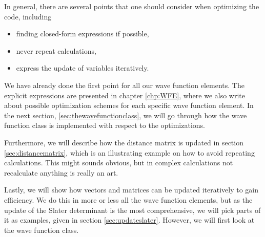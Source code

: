 In general, there are several points that one should consider when optimizing the code, including
\begin{itemize}
	\item finding closed-form expressions if possible,
	\item never repeat calculations,
	\item express the update of variables iteratively.
\end{itemize}
We have already done the first point for all our wave function elements. The explicit expressions are presented in chapter \ref{chp:WFE}, where we also write about possible optimization schemes for each specific wave function element. In the next section, \ref{sec:thewavefunctionclass}, we will go through how the wave function class is implemented with respect to the optimizations.

Furthermore, we will describe how the distance matrix is updated in section \ref{sec:distancematrix}, which is an illustrating example on how to avoid repeating calculations. This might sounds obvious, but in complex calculations not recalculate anything is really an art. 

Lastly, we will show how vectors and matrices can be updated iteratively to gain efficiency. We do this in more or less all the wave function elements, but as the update of the Slater determinant is the most comprehensive, we will pick parts of it as examples, given in section \ref{sec:updateslater}. However, we will first look at the wave function class. 

